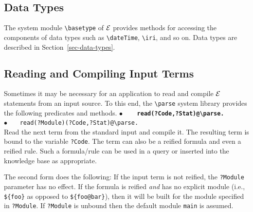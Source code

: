 \documentclass[11pt]{article}
\newcommand{\ERGO}{\mbox{\ensuremath{\cal{E}}\smaller{{\sc{RGO}}}}\xspace}
\newcommand{\FLSYSTEM}{\ERGO}
\newcommand{\bs}{\textbackslash}
\begin{document}
\subsection{Data Types}\label{sec-data-types-sysmod}

The system module \texttt{\bs{}basetype}   of \FLSYSTEM provides methods for accessing the components
of data types such as {\tt \bs{}dateTime}, {\tt \bs{}iri}, and so on.
Data types are described in Section~\ref{sec-data-types}.






\subsection{Reading and Compiling Input Terms}\label{sec-parse-compile}

Sometimes it may be necessary for an application to read and compile \FLSYSTEM
statements from an input source. To this end, the {\tt \bs{}parse} 
system library provides the following predicates and methods.
\noindent
\textbf{$\bullet$~~~ \tt  read(?Code,?Stat)@\bs{}parse.} ~~\\
{$\bullet$~~~ \tt  read(?Module)(?Code,?Stat)@\bs{}parse.} ~~\\
Read the next term from the standard input and compile it. The resulting
term is bound to the variable {\tt ?Code}.  The term can also be a reified
formula and even a reified rule.  Such a formula/rule can be used in a
query or inserted into the knowledge base as appropriate.

\noindent
The second form does the following:
If the input term
is not reified, the {\tt ?Module} parameter has no effect. If the formula is
reified \emph{and} has no explicit module (i.e., \texttt{\$\{foo\}} as
opposed to \texttt{\$\{foo@bar\}}), then it will be built for the module specified in {\tt ?Module}. If
{\tt ?Module} is unbound then the default module {\tt main} is assumed.
\end{document}
